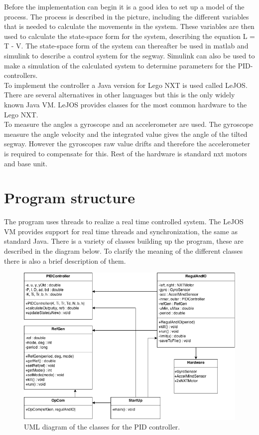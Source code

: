 \documentclass[a4paper]{article}
\begin{document}
Before the implementation can begin it is a good idea to set up a model of the process. The process is described in the picture, including the different variables that is needed to calculate the movements in the system. These variables are then used to calculate the state-space form for the system, describing the equation L = T - V. The state-space form of the system can thereafter be used in matlab and simulink to describe a control system for the segway. Simulink can also be used to make a simulation of the calculated system to determine parameters for the PID-controllers. \\

To implement the controller a Java version for Lego NXT is used called LeJOS. There are several alternatives in other languages but this is the only widely known Java VM. LeJOS provides classes for the most common hardware to the Lego NXT.  \\

To measure the angles a gyroscope and an accelerometer are used. The gyroscope measure the angle velocity and the integrated value gives the angle of the tilted segway. However the gyroscopes raw value drifts and therefore the accelerometer is required to compensate for this. Rest of the hardware is standard nxt motors and base unit.

\section{Program structure}
The program uses threads to realize a real time controlled system. The LeJOS VM provides support for real time threads and synchronization, the same as standard Java. There is a variety of classes building up the program, these are described in the diagram below. To clarify the meaning of the different classes there is also a brief description of them.

\begin{figure}[H]
 \centering
\includegraphics[scale=0.5]{pic/UML_LEGO_SEGWAY_ALLCAPS.png}
\caption{UML diagram of the classes for the PID controller.}
\end{figure}
\end{document}

